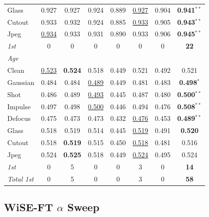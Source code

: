 \begin{table}[htbp]
\begin{tabular}{lccccccc}
Glass      & 0.927 & 0.927 & 0.924 & 0.889 & \underline{0.927} & 0.904 & \textbf{0.941}$^{**}$ \\
Cutout     & 0.933 & 0.932 & 0.924 & 0.885 & \underline{0.933} & 0.905 & \textbf{0.943}$^{**}$ \\
Jpeg       & \underline{0.934} & 0.933 & 0.931 & 0.890 & 0.933 & 0.906 & \textbf{0.945}$^{**}$ \\
\textit{1st} & 0 & 0 & 0 & 0 & 0 & 0 & \textbf{22} \\
\midrule
\multicolumn{8}{l}{\textit{Age}} \\
Clean      & \underline{0.523} & \textbf{0.524} & 0.518 & 0.449 & 0.521 & 0.492 & 0.521 \\
Gaussian   & 0.484 & 0.484 & \underline{0.489} & 0.449 & 0.481 & 0.483 & \textbf{0.498}$^{*}$ \\
Shot       & 0.486 & 0.489 & \underline{0.493} & 0.445 & 0.487 & 0.480 & \textbf{0.500}$^{**}$ \\
Impulse    & 0.497 & 0.498 & \underline{0.500} & 0.446 & 0.494 & 0.476 & \textbf{0.508}$^{**}$ \\
Defocus    & 0.475 & 0.473 & 0.473 & 0.432 & \underline{0.476} & 0.453 & \textbf{0.489}$^{**}$ \\
Glass      & 0.518 & 0.519 & 0.514 & 0.445 & \underline{0.519} & 0.491 & \textbf{0.520} \\
Cutout     & 0.518 & \textbf{0.519} & 0.515 & 0.450 & \underline{0.518} & 0.481 & 0.516 \\
Jpeg       & 0.524 & \textbf{0.525} & 0.518 & 0.449 & \underline{0.524} & 0.495 & 0.524 \\
\textit{1st} & 0 & 5 & 0 & 0 & 3 & 0 & \textbf{14} \\
\textit{Total 1st} & 0 & 5 & 0 & 0 & 3 & 0 & \textbf{58} \\
\bottomrule
\end{tabular}
\end{table}


\subsection{WiSE-FT $\alpha$ Sweep}
\label{app:wiseft}


